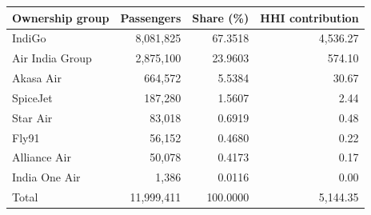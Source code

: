 \begin{tabular}{@{}lrrr@{}}
\toprule
Ownership group & Passengers & Share (\%) & HHI contribution \\
\midrule
IndiGo & 8,081,825 & 67.3518 & 4,536.27 \\
Air India Group & 2,875,100 & 23.9603 & 574.10 \\
Akasa Air & 664,572 & 5.5384 & 30.67 \\
SpiceJet & 187,280 & 1.5607 & 2.44 \\
Star Air & 83,018 & 0.6919 & 0.48 \\
Fly91 & 56,152 & 0.4680 & 0.22 \\
Alliance Air & 50,078 & 0.4173 & 0.17 \\
India One Air & 1,386 & 0.0116 & 0.00 \\
\midrule
Total & 11,999,411 & 100.0000 & 5,144.35 \\
\bottomrule
\end{tabular}
